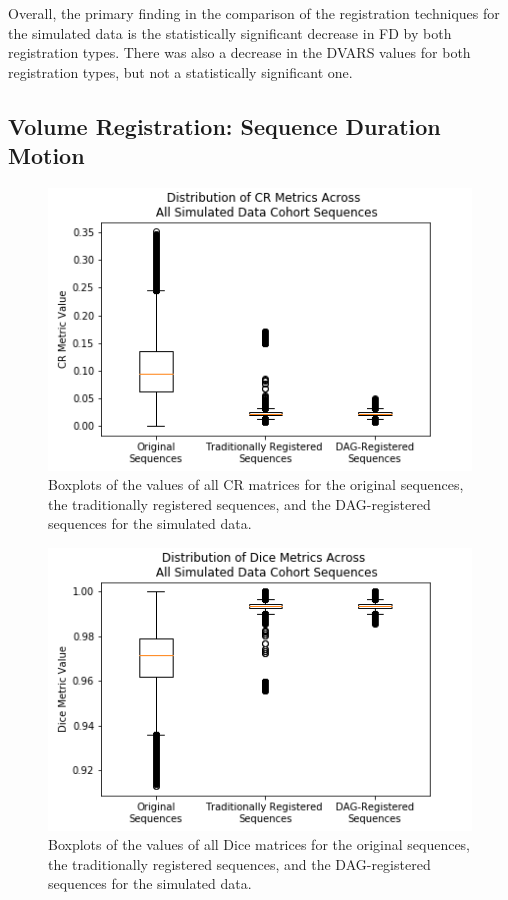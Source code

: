 Overall, the primary finding in the comparison of the registration techniques for the simulated data is the statistically significant decrease in FD by both registration types. There was also a decrease in the DVARS values for both registration types, but not a statistically significant one.

\subsection{Volume Registration: Sequence Duration Motion}

\begin{figure}
\centering
\includegraphics[height=0.3\textheight]{6/figures/spectr-cr-box.png}
\caption{Boxplots of the values of all CR matrices for the original sequences, the traditionally registered sequences, and the DAG-registered sequences for the simulated data.}
\label{fig:spectr-cr-box}
\end{figure}

\begin{figure}
\centering
\includegraphics[height=0.3\textheight]{6/figures/spectr-dice-box.png}
\caption{Boxplots of the values of all Dice matrices for the original sequences, the traditionally registered sequences, and the DAG-registered sequences for the simulated data.}
\label{fig:spectr-dice-box}
\end{figure}

